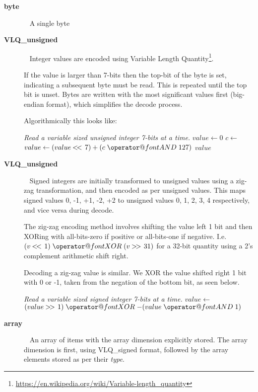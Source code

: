 \documentclass[a4paper]{article}
\makeatletter
\newcommand*{\bitand}{%
  \nonscript\mskip-\medmuskip\mkern5mu%
  \mathbin{\operator@font AND}\penalty900\mkern5mu%
  \nonscript\mskip-\medmuskip
}
\newcommand*{\bitxor}{%
  \nonscript\mskip-\medmuskip\mkern5mu%
  \mathbin{\operator@font XOR}\penalty900\mkern5mu%
  \nonscript\mskip-\medmuskip
}
\newcommand\shiftl{\mathbin{<\mkern-3mu<\,}}
\newcommand\shiftr{\mathbin{>\mkern-3mu>\,}}
\makeatother
\begin{document}
\begin{description}
\item[\textbf{byte}]\ \newline
A single byte

\item[\textbf{VLQ\_unsigned}]\ \newline
Integer values are encoded using Variable Length
Quantity\footnote{\url{https://en.wikipedia.org/wiki/Variable-length_quantity}}.

If the value is larger than 7-bits then the top-bit of the byte is
set, indicating a subsequent byte must be read.  This is repeated
until the top bit is unset. Bytes are written with the most
significant values first (big-endian format), which simplifies the
decode process.

Algorithmically this looks like:

\begin{algorithmic}[1]
\Statex
\Statex \textit{Read a variable sized unsigned integer 7-bits at a time.}
  \State $value \gets 0$
  \Repeat
    \State $c \gets$ 
    \State $value \gets (value \shiftl 7) + (c \bitand 127)$
  \State \Return $value$
  \EndFunction
\end{algorithmic}

\item[\textbf{VLQ\_unsigned}]\ \newline
Signed integers are initially transformed to unsigned values using a zig-zag transformation, and then encoded as per unsigned values.
This maps signed values 0, -1, +1, -2, +2 to unsigned values 0, 1, 2, 3, 4 respectively, and vice versa during decode.

The zig-zag encoding method involves shifting the value left 1
bit and then XORing with all-bits-zero if positive or all-bits-one if
negative. I.e. $(v \shiftl 1) \bitxor (v \shiftr 31)$ for a
32-bit quantity using a 2's complement arithmetic shift right.

Decoding a zig-zag value is similar.  We XOR the value shifted right 1
bit with 0 or -1, taken from the negation of the bottom bit, as seen
below.

\begin{algorithmic}[1]
\Statex
\Statex \textit{Read a variable sized signed integer 7-bits at a time.}
  \State $value \gets $ 
  \State \Return $(value \shiftr 1) \bitxor -(value \bitand 1)$
  \EndFunction
\end{algorithmic}

\item[\textbf{array}]\ \newline
An array of items with the array dimension explicitly stored.
The array dimension is first, using VLQ\_signed format, followed by the array elements stored as per their \textit{type}.

\end{description}
\end{document}
